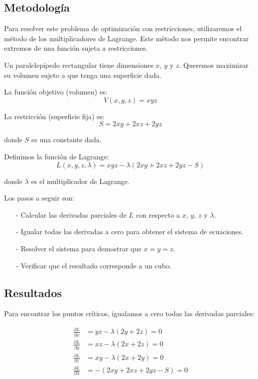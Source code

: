 \documentclass{article}
\begin{document}
\subsection{Metodología}

Para resolver este problema de optimización con restricciones, utilizaremos el método de los multiplicadores de Lagrange. Este método nos permite encontrar extremos de una función sujeta a restricciones. 

Un paralelepípedo rectangular tiene dimensiones $x$, $y$ y $z$. Queremos maximizar su volumen sujeto a que tenga una superficie dada.

La función objetivo (volumen) es:
$$V(x,y,z) = xyz$$

La restricción (superficie fija) es:
$$S = 2xy + 2xz + 2yz$$

donde $S$ es una constante dada.

Definimos la función de Lagrange:
$$L(x,y,z,\lambda) = xyz - \lambda(2xy + 2xz + 2yz - S)$$

donde $\lambda$ es el multiplicador de Lagrange.

Los pasos a seguir son:
\begin{enumerate}
    \item[-] Calcular las derivadas parciales de $L$ con respecto a $x$, $y$, $z$ y $\lambda$.
    \item[-] Igualar todas las derivadas a cero para obtener el sistema de ecuaciones.
    \item[-] Resolver el sistema para demostrar que $x = y = z$.
    \item[-] Verificar que el resultado corresponde a un cubo.
\end{enumerate}

\subsection{Resultados}
\setcounter{equation}{0}

Para encontrar los puntos críticos, igualamos a cero todas las derivadas parciales:

\begin{align}
\frac{\partial L}{\partial x} &= yz - \lambda(2y + 2z) = 0 \\
\frac{\partial L}{\partial y} &= xz - \lambda(2x + 2z) = 0 \\
\frac{\partial L}{\partial z} &= xy - \lambda(2x + 2y) = 0 \\
\frac{\partial L}{\partial \lambda} &= -(2xy + 2xz + 2yz - S) = 0
\end{align}
\end{document}
